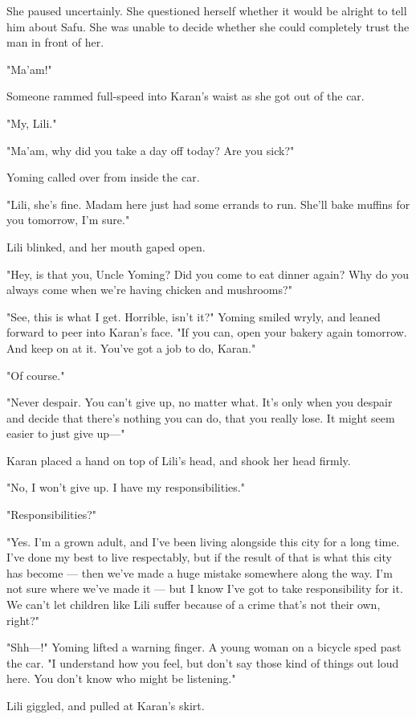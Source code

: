 She paused uncertainly. She questioned herself whether it would be
alright to tell him about Safu. She was unable to decide whether she
could completely trust the man in front of her.

"Ma'am!"

Someone rammed full-speed into Karan's waist as she got out of the car.

"My, Lili."

"Ma'am, why did you take a day off today? Are you sick?"

Yoming called over from inside the car.

"Lili, she's fine. Madam here just had some errands to run. She'll bake
muffins for you tomorrow, I'm sure."

Lili blinked, and her mouth gaped open.

"Hey, is that you, Uncle Yoming? Did you come to eat dinner again? Why
do you always come when we're having chicken and mushrooms?"

"See, this is what I get. Horrible, isn't it?" Yoming smiled wryly, and
leaned forward to peer into Karan's face. "If you can, open your bakery
again tomorrow. And keep on at it. You've got a job to do, Karan."

"Of course."

"Never despair. You can't give up, no matter what. It's only when you
despair and decide that there's nothing you can do, that you really
lose. It might seem easier to just give up---"

Karan placed a hand on top of Lili's head, and shook her head firmly.

"No, I won't give up. I have my responsibilities."

"Responsibilities?"

"Yes. I'm a grown adult, and I've been living alongside this city for a
long time. I've done my best to live respectably, but if the result of
that is what this city has become --- then we've made a huge mistake
somewhere along the way. I'm not sure where we've made it --- but I know
I've got to take responsibility for it. We can't let children like Lili
suffer because of a crime that's not their own, right?"

"Shh---!" Yoming lifted a warning finger. A young woman on a bicycle sped
past the car. "I understand how you feel, but don't say those kind of
things out loud here. You don't know who might be listening."

Lili giggled, and pulled at Karan's skirt.

